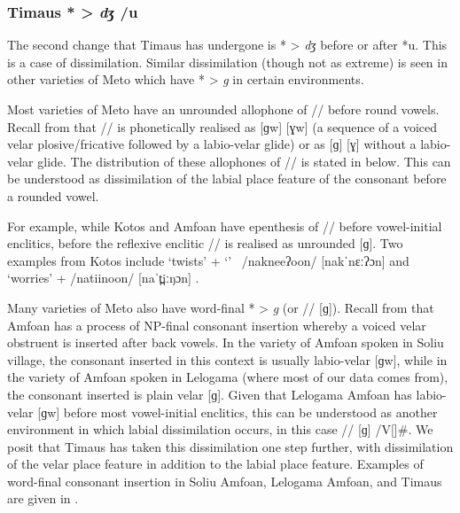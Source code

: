 \documentclass[output=paper]{langscibook}
\begin{document}
\subsubsection{Timaus *{\gw} > \textit{dʒ} /u}\label{sec:gw > j /u}
The second change that Timaus has undergone is
*{\gw} > \textit{dʒ} before or after *u.
This is a case of dissimilation.
Similar dissimilation (though not as extreme)
is seen in other varieties of Meto
which have *{\gw} > \textit{g} in certain environments.

Most varieties of Meto have an unrounded allophone
of /{\gw}/ before round vowels.
Recall from  that /\gw/
is phonetically realised as [ɡw] {\tl} [ɣw]
(a sequence of a voiced velar plosive/fricative
followed by a labio-velar glide) or as [ɡ] {\tl} [ɣ]
without a labio-velar glide.
The distribution of these allophones of /\gw/
is stated in  below.
This can be understood as dissimilation of the labial place feature
of the consonant before a rounded vowel.

\begin{exe}
	\label{ex:ReaGWMet}
		\begin{xlist}
		\end{xlist}
\end{exe}

For example, while Kotos and Amfo{\Q}an have epenthesis of /\gw/
before vowel-initial enclitics,
before the reflexive enclitic  /\gw/ is realised as unrounded [ɡ].
Two examples from Kotos include  `twists' +  `'
\mbox{{\ra} /nakneeʔ\tbr{\gw}oon/} {\ra} [nakˈnɛːʔɔn]
and  `worries' + 
{\ra} \mbox{/natiin\tbr{\gw}oon/} {\ra} [naˈt̪iːŋɔn] \citep[102]{ed20}.

Many varieties of Meto also have word-final *{\gw} > \textit{g} (or /\gw/ {\ra} [ɡ]).
Recall from  that Amfo{\Q}an has a
process of NP-final consonant insertion whereby a voiced
velar obstruent is inserted after back vowels.
In the variety of Amfo{\Q}an spoken in Soliu village,
the consonant inserted in this context is usually labio-velar [ɡw],
while in the variety of Amfo{\Q}an spoken in Lelogama
(where most of our data comes from), the consonant inserted is plain velar [ɡ].
Given that Lelogama Amfo{\Q}an has labio-velar [ɡw]
before most vowel-initial enclitics,
this can be understood as another environment in
which labial dissimilation occurs, in this case /\gw/ {\ra} [ɡ] /V[]{\gap}{\#}.
We posit that Timaus has taken this dissimilation one step further,
with dissimilation of the velar place feature in addition to the labial place feature.
Examples of word-final consonant insertion in Soliu Amfo{\Q}an,
Lelogama Amfo{\Q}an, and Timaus are given in .
\end{document}
